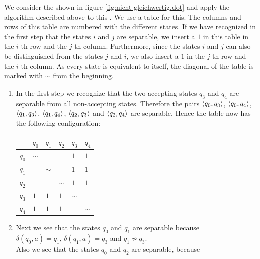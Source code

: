\exampleEng
We consider the   shown in figure \ref{fig:nicht-gleichwertig.dot} and apply the algorithm
described above to this . 
We use a table for this.  The columns and rows of this table are numbered with the different states.  If we
have recognized in the first step that the states $i$ and $j$ are separable, we insert a $1$ in this
table in the $i$-th row and the $j$-th column. 
Furthermore, since the states $i$ and $j$ can also be distinguished from the states $j$ and $i$, we also insert
a $1$ in the $j$-th row and the $i$-th column.
As every state is equivalent to itself, the diagonal of the table is marked with $\sim$ from the beginning.
\begin{enumerate}
\item In the first step we recognize that the two accepting states $q_3$ and $q_4$ are separable from all non-accepting states.
      Therefore the pairs 
      $\pair(q_0,q_3)$,
      $\pair(q_0,q_4)$,
      $\pair(q_1,q_3)$,
      $\pair(q_1,q_4)$,
      $\pair(q_2,q_3)$ and
      $\pair(q_2,q_4)$
      are separable. Hence the table now has the following configuration:
      \begin{center}        
      \begin{tabular}[t]{|l||l|l|l|l|l|}
      \hline
            & $q_0$    &    $q_1$ &    $q_2$ &      $q_3$ &      $q_4$  \\
      \hline
      \hline
      $q_0$ & $\sim$   &          &          & $1$ & $1$  \\
      \hline
      $q_1$ &          & $\sim$   &          &$1$ &$1$  \\
      \hline
      $q_2$ &          &          & $\sim$   &$1$ &$1$  \\
      \hline
      $q_3$ &$1$        &$1$         &       $1$ & $\sim$   &           \\
      \hline
      $q_4$ &$1$ &$1$ &$1$ &          & $\sim$    \\
      \hline
      \end{tabular}
      \end{center}
\item Next we see that the states $q_0$ and $q_1$ are separable because
      \\[0.2cm]
      \hspace*{1.3cm}
      $\delta(q_0,a) = q_1$, \quad $\delta(q_1,a) = q_3$ \quad and \quad $q_1 \not\sim q_3$.
      \\[0.2cm]
      Also we see that the states $q_0$ and $q_2$ are separable, because

\end{enumerate}
